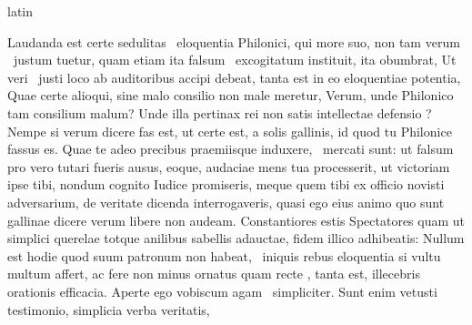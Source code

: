 \documentclass[12pt]{book}
\renewenvironment{latin}
    	{\begin{hyphenrules}{latin}}
    	{\end{hyphenrules}}
\begin{document}
\begin{pages}
\begin{latin}
\begin{Leftside}
                  Laudanda est certe sedulitas  \ampersand\ eloquentia Philonici, qui more suo, non tam verum  \ampersand\ justum tuetur, quam etiam ita falsum  \ampersand\ excogitatum instituit, ita obumbrat,
                  Ut veri  \ampersand\ justi loco ab auditoribus accipi debeat, tanta est in eo eloquentiae potentia, Quae certe alioqui, sine malo consilio non male meretur, Verum, unde Philonico tam consilium malum?
                  Unde illa pertinax rei non satis intellectae defensio ?
                   Nempe si verum dicere fas est, ut certe est, a solis gallinis, id quod tu Philonice fassus es. Quae te adeo precibus praemiisque induxere,  \ampersand\ mercati sunt: 
                  ut falsum pro vero tutari fueris ausus, eoque, audaciae mens tua processerit, ut victoriam ipse tibi, nondum cognito Iudice promiseris, meque quem tibi ex officio novisti adversarium, de veritate dicenda interrogaveris, 
                  quasi ego eius animo quo sunt gallinae dicere verum libere non audeam. Constantiores estis Spectatores quam ut simplici querelae totque anilibus sabellis adauctae, fidem illico adhibeatis: 
                  Nullum est hodie  quod suum patronum non habeat,  \ampersand\ iniquis rebus eloquentia si vultu multum affert, ac fere non minus ornatus
                  quam recte , tanta est,  illecebris orationis efficacia. Aperte ego vobiscum agam  \ampersand\ simpliciter.
                  Sunt enim vetusti  testimonio, simplicia verba veritatis, 


\end{Leftside}
\end{latin}
\end{pages}
\end{document}
